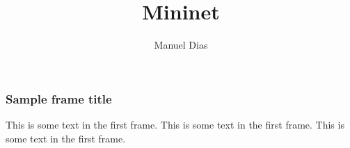 \documentclass{beamer}
\title{Mininet}
\author{Manuel Dias}
\institute{UCLouvain}
\date
\begin{document}
\frame{\titlepage}

\begin{frame}
\frametitle{Sample frame title}
This is some text in the first frame. This is some text in the first frame. This is some text in the first frame.
\end{frame}
\end{document}
